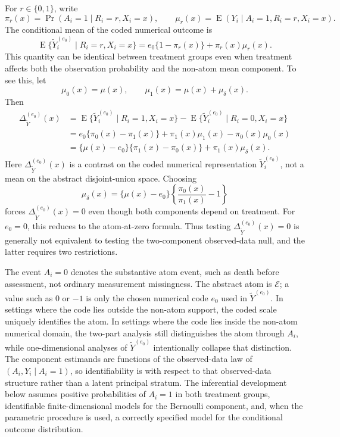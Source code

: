 \documentclass[11pt]{article}
\DeclareMathOperator*{\E}{E}
\begin{document}
For $r\in\{0,1\}$, write
\[
  \pi_r(x)=\Pr(A_i=1\mid R_i=r,X_i=x),
  \qquad
  \mu_r(x)=\E(Y_i\mid A_i=1,R_i=r,X_i=x).
\]
The conditional mean of the coded numerical outcome is
\[
  \E\{\widetilde{Y}_i^{(e_0)}\mid R_i=r,X_i=x\}
  = e_0\{1-\pi_r(x)\}+\pi_r(x)\mu_r(x).
\]
This quantity can be identical between treatment groups even when treatment affects both the observation probability and the non-atom mean component. To see this, let
\[
  \mu_0(x)=\mu(x),
  \qquad
  \mu_1(x)=\mu(x)+\mu_\delta(x).
\]
Then
\begin{align*}
  \Delta_{\widetilde{Y}}^{(e_0)}(x)
  &= \E\{\widetilde{Y}_i^{(e_0)}\mid R_i=1,X_i=x\}
     -\E\{\widetilde{Y}_i^{(e_0)}\mid R_i=0,X_i=x\}\\
  &= e_0\{\pi_0(x)-\pi_1(x)\}
     +\pi_1(x)\mu_1(x)-\pi_0(x)\mu_0(x)\\
  &= \{\mu(x)-e_0\}\{\pi_1(x)-\pi_0(x)\}
     +\pi_1(x)\mu_\delta(x).
\end{align*}
Here $\Delta_{\widetilde{Y}}^{(e_0)}(x)$ is a contrast on the coded numerical representation $\widetilde{Y}_i^{(e_0)}$, not a mean on the abstract disjoint-union space.
Choosing
\[
  \mu_\delta(x)
  =\{\mu(x)-e_0\}
  \left\{\frac{\pi_0(x)}{\pi_1(x)}-1\right\}
\]
forces $\Delta_{\widetilde{Y}}^{(e_0)}(x)=0$ even though both components depend on treatment. For $e_0=0$, this reduces to the atom-at-zero formula. Thus testing $\Delta_{\widetilde{Y}}^{(e_0)}(x)=0$ is generally not equivalent to testing the two-component observed-data null, and the latter requires two restrictions.

The event $A_i=0$ denotes the substantive atom event, such as death before assessment, not ordinary measurement missingness. The abstract atom is $\mathcal{E}$; a value such as $0$ or $-1$ is only the chosen numerical code $e_0$ used in $\widetilde{Y}^{(e_0)}$. In settings where the code lies outside the non-atom support, the coded scale uniquely identifies the atom. In settings where the code lies inside the non-atom numerical domain, the two-part analysis still distinguishes the atom through $A_i$, while one-dimensional analyses of $\widetilde{Y}^{(e_0)}$ intentionally collapse that distinction. The component estimands are functions of the observed-data law of $(A_i,Y_i\mid A_i=1)$, so identifiability is with respect to that observed-data structure rather than a latent principal stratum. The inferential development below assumes positive probabilities of $A_i = 1$ in both treatment groups, identifiable finite-dimensional models for the Bernoulli component, and, when the parametric procedure is used, a correctly specified model for the conditional outcome distribution.
\end{document}
